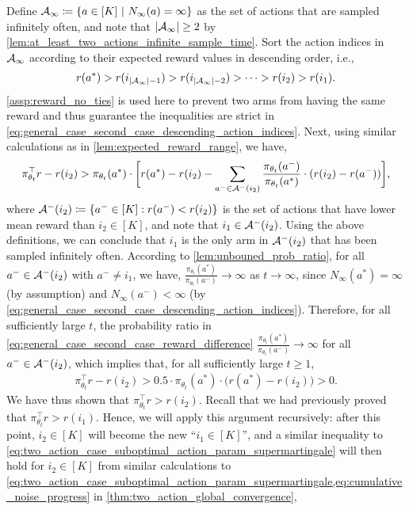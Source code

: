 Define ${\mathcal{A}}_\infty \coloneqq \left\{ a \in [K] \ | \ N_\infty(a) = \infty \right\}$ as the set of actions that are sampled infinitely often, and note that $| {\mathcal{A}}_\infty | \ge 2$ by \cref{lem:at_least_two_actions_infinite_sample_time}. Sort the action indices in ${\mathcal{A}}_\infty$ according to their expected reward values in descending order, i.e.,
\begin{align}
\label{eq:general_case_second_case_descending_action_indices}
    r(a^*) > r(i_{|{\mathcal{A}}_\infty| - 1}) > r(i_{|{\mathcal{A}}_\infty| - 2}) > \cdots > r(i_2) > r(i_1).
\end{align}
\cref{assp:reward_no_ties} is used here to prevent two arms from having the same reward and thus guarantee the inequalities are strict in \cref{eq:general_case_second_case_descending_action_indices}. Next, using similar calculations as in \cref{lem:expected_reward_range}, we have,
\begin{align}
\label{eq:general_case_second_case_reward_difference}
    \pi_{\theta_t}^\top r - r(i_2) > \pi_{\theta_t}(a^*) \cdot \bigg[ r(a^*) - r(i_2) - \sum_{a^- \in {\mathcal{A}}^-(i_2)}{ \frac{ \pi_{\theta_t}(a^-)}{ \pi_{\theta_t}(a^*) } \cdot ( r(i_2) - r(a^-)) } \bigg],
\end{align}
where ${\mathcal{A}}^-(i_2) \coloneqq \left\{ a^- \in [K]: r(a^-) < r(i_2) \right\}$ is the set of actions that have lower mean reward than $i_2 \in [K]$, and note that $i_1 \in {\mathcal{A}}^-(i_2)$. Using the above definitions, we can conclude that $i_1$ is the only arm in ${\mathcal{A}}^-(i_2)$ that has been sampled infinitely often. According to \cref{lem:unbouned_prob_ratio}, for all $a^- \in {\mathcal{A}}^-(i_2)$ with $a^- \ne i_1$, we have, $\frac{ \pi_{\theta_t}(a^*) }{ \pi_{\theta_t}(a^-)} \to \infty$ as $t \to \infty$, since $N_\infty(a^*) = \infty$ (by assumption) and $N_\infty(a^-) < \infty$ (by \cref{eq:general_case_second_case_descending_action_indices}). Therefore, for all sufficiently large $t$, the probability ratio in \cref{eq:general_case_second_case_reward_difference} $ \frac{ \pi_{\theta_t}(a^*)}{ \pi_{\theta_t}(a^-)} \to \infty$ for all $a^- \in {\mathcal{A}}^-(i_2)$, which implies that, for all sufficiently large $t \ge 1$,
\begin{align}
\label{eq:general_case_second_case_positive_reward_difference_a}
    \pi_{\theta_t}^\top r - r(i_2) > 0.5 \cdot \pi_{\theta_t}(a^*) \cdot \big( r(a^*) - r(i_2) \big) > 0.
\end{align}
We have thus shown that $\pi_{\theta_t}^\top r > r(i_2)$. Recall that we had previously proved that $\pi_{\theta_t}^\top r > r(i_1)$. Hence, we will apply this argument recursively: after this point, $i_2 \in [K]$ will become the new ``$i_1 \in [K]$'', and a similar inequality to \cref{eq:two_action_case_suboptimal_action_param_supermartingale} will then hold for $i_2 \in [K]$ from similar calculations to \cref{eq:two_action_case_suboptimal_action_param_supermartingale,eq:cumulative_noise_progress} in \cref{thm:two_action_global_convergence},
